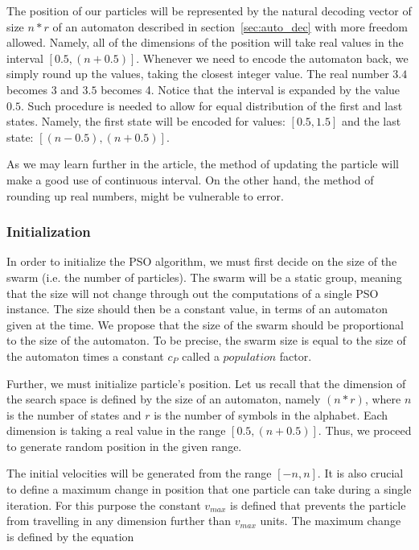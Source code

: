 \documentclass{article}
\begin{document}
The position of our particles will be represented by the natural decoding vector of size $n*r$ of an automaton described in section~\ref{sec:auto_dec} with more freedom allowed. Namely, all of the dimensions of the position will take real values in the interval $[0.5, (n+0.5)]$. Whenever we need to encode the automaton back, we simply round up the values, taking the closest integer value. The real number $3.4$ becomes $3$ and $3.5$ becomes 4. Notice that the interval is expanded by the value $0.5$. Such procedure is needed to allow for equal distribution of the first and last states. Namely, the first state will be encoded for values: $[0.5, 1.5]$ and the last state: $[(n-0.5), (n+0.5)]$.

As we may learn further in the article, the method of updating the particle will make a good use of continuous interval. On the other hand, the method of rounding up real numbers, might be vulnerable to error.



\subsubsection{Initialization}
In order to initialize the PSO algorithm, we must first decide on the size of the swarm (i.e. the number of particles). The swarm will be a static group, meaning that the size will not change through out the computations of a single PSO instance. The size should then be a constant value, in terms of an automaton given at the time. We propose that the size of the swarm should be proportional to the size of the automaton. To be precise, the swarm size is equal to the size of the automaton times a constant $c_P$ called a $population$ factor.

Further, we must initialize particle's position. Let us recall that the dimension of the search space is defined by the size of an automaton, namely $(n*r)$, where $n$ is the number of states and $r$ is the number of symbols in the alphabet. Each dimension is taking a real value in the range $[0.5, (n+0.5)]$. Thus, we proceed to generate random position in the given range.

The initial velocities will be generated from the range $[-n,n]$. It is also crucial to define a maximum change in position that one particle can take during a single iteration. For this purpose the constant $v_{max}$ is defined that prevents the particle from travelling in any dimension further than $v_{max}$ units. The maximum change is defined by the equation 
\end{document}

